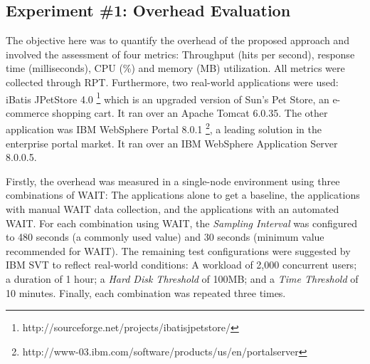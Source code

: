 \documentclass[runningheads,a4paper]{llncs}
\begin{document}
\vspace{-7pt}
\subsection{Experiment \#1: Overhead Evaluation}
\vspace{-7pt}

The objective here was to quantify the overhead of the proposed approach and
involved the assessment of four metrics: Throughput (hits per second), response
time (milliseconds), CPU (\%) and memory (MB) utilization. All metrics were
collected through RPT. Furthermore, two real-world applications were used:
iBatis JPetStore 4.0 \footnote{http://sourceforge.net/projects/ibatisjpetstore/}
which is an upgraded version of Sun's Pet Store, an e-commerce shopping cart. It
ran over an Apache Tomcat 6.0.35. The other application was IBM WebSphere Portal 
8.0.1 \footnote{http://www-03.ibm.com/software/products/us/en/portalserver},
a leading solution in the enterprise portal market. It ran over an IBM WebSphere
Application Server 8.0.0.5.


Firstly, the overhead was measured in a single-node environment using three
combinations of WAIT: The applications alone to get a baseline, the applications
with manual WAIT data collection, and the applications with an automated
WAIT. For each combination using WAIT, the \emph{Sampling Interval} was
configured to 480 seconds (a commonly used value) and 30 seconds (minimum value 
recommended for WAIT). The remaining test configurations were suggested by IBM SVT to
reflect real-world conditions: A workload of 2,000 concurrent users; a duration
of 1 hour; a \emph{Hard Disk Threshold} of 100MB; and a \emph{Time Threshold} of
10 minutes. Finally, each combination was repeated three times.
\end{document}
